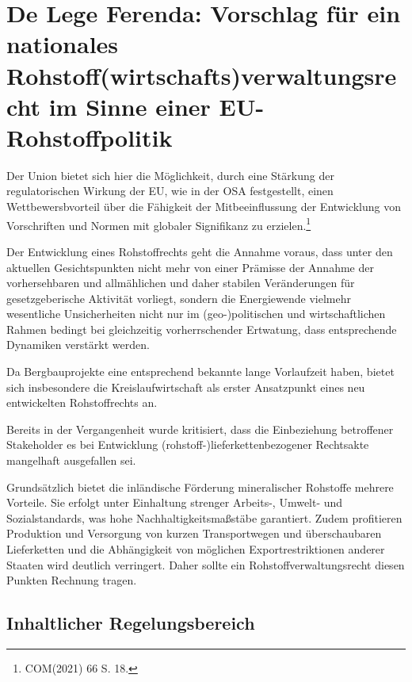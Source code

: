 \documentclass[12pt,a4paper,oneside]{book} %
\begin{document}
	

\section{De Lege Ferenda: Vorschlag für ein nationales Rohstoff(wirtschafts)verwaltungsrecht im Sinne einer EU-Rohstoffpolitik}


Der Union bietet sich hier die Möglichkeit, durch eine Stärkung der regulatorischen Wirkung der EU, wie in der OSA festgestellt, einen Wettbewersbvorteil über die Fähigkeit der Mitbeeinflussung der Entwicklung von Vorschriften und Normen mit globaler Signifikanz zu erzielen.\footnote{COM(2021) 66 S. 18.}

Der Entwicklung eines Rohstoffrechts geht die Annahme voraus, dass unter den aktuellen Gesichtspunkten nicht mehr von einer Prämisse der Annahme der vorhersehbaren und allmählichen und daher stabilen Veränderungen für gesetzgeberische Aktivität vorliegt\autocite{Craig et al, Balancing stability and flexibility in adaptive governance: an analysis of tools available in U.S. environmental law}, sondern die Energiewende vielmehr wesentliche Unsicherheiten nicht nur im (geo-)politischen und wirtschaftlichen Rahmen bedingt bei gleichzeitig vorherrschender Ertwatung, dass entsprechende Dynamiken verstärkt werden.\autocite{bibid}

Da Bergbauprojekte eine entsprechend bekannte lange Vorlaufzeit haben, bietet sich insbesondere die Kreislaufwirtschaft als erster Ansatzpunkt eines neu entwickelten Rohstoffrechts an.

Bereits in der Vergangenheit wurde kritisiert, dass die Einbeziehung betroffener Stakeholder es bei Entwicklung (rohstoff-)lieferkettenbezogener Rechtsakte mangelhaft ausgefallen sei.

Grundsätzlich bietet die inländische Förderung mineralischer Rohstoffe mehrere Vorteile. Sie erfolgt unter Einhaltung strenger Arbeits-, Umwelt- und Sozialstandards, was hohe Nachhaltigkeitsmaßstäbe garantiert. Zudem profitieren Produktion und Versorgung von kurzen Transportwegen und überschaubaren Lieferketten und  die Abhängigkeit von möglichen Exportrestriktionen anderer Staaten wird deutlich verringert. Daher sollte ein Rohstoffverwaltungsrecht diesen Punkten Rechnung tragen.

\subsection{Inhaltlicher Regelungsbereich}
\end{document}
